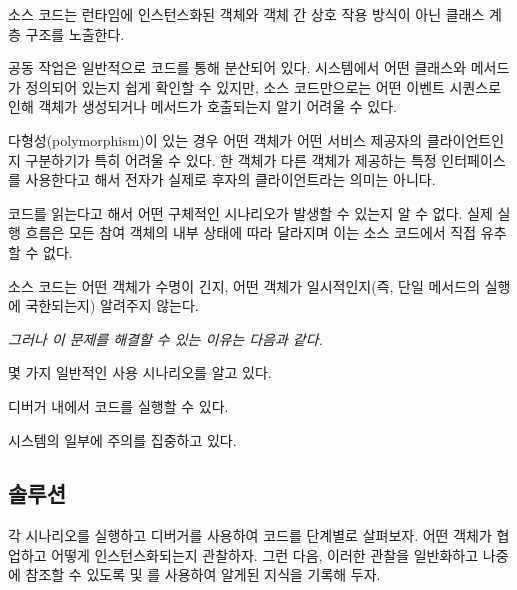 \documentclass[a4paper,10pt,twoside]{book}
\begin{document}
\begin{bulletlist}
\item 소스 코드는 런타임에 인스턴스화된 객체와 객체 간 상호 작용 방식이 아닌 클래스 계층 구조를 노출한다.

\item 공동 작업은 일반적으로 코드를 통해 분산되어 있다. 시스템에서 어떤 클래스와 메서드가 정의되어 있는지 쉽게 확인할 수 있지만, 소스 코드만으로는 어떤 이벤트 시퀀스로 인해 객체가 생성되거나 메서드가 호출되는지 알기 어려울 수 있다.

\item 다형성(polymorphism)이 있는 경우 어떤 객체가 어떤 서비스 제공자의 클라이언트인지 구분하기가 특히 어려울 수 있다. 한 객체가 다른 객체가 제공하는 특정 인터페이스를 사용한다고 해서 전자가 실제로 후자의 클라이언트라는 의미는 아니다.

\item 코드를 읽는다고 해서 어떤 구체적인 시나리오가 발생할 수 있는지 알 수 없다. 실제 실행 흐름은 모든 참여 객체의 내부 상태에 따라 달라지며 이는 소스 코드에서 직접 유추할 수 없다.

\item 소스 코드는 어떤 객체가 수명이 긴지, 어떤 객체가 일시적인지(즉, 단일 메서드의 실행에 국한되는지) 알려주지 않는다.
\end{bulletlist}

\emph{그러나 이 문제를 해결할 수 있는 이유는 다음과 같다.}

\begin{bulletlist}
\item 몇 가지 일반적인 사용 시나리오를 알고 있다.

\item 디버거 내에서 코드를 실행할 수 있다.

\item 시스템의 일부에 주의를 집중하고 있다.
\end{bulletlist}

\subsection*{솔루션}

각 시나리오를 실행하고 디버거를 사용하여 코드를 단계별로 살펴보자. 어떤 객체가 협업하고 어떻게 인스턴스화되는지 관찰하자. 그런 다음, 이러한 관찰을 일반화하고 나중에 참조할 수 있도록  및 를 사용하여 알게된 지식을 기록해 두자.
\end{document}
